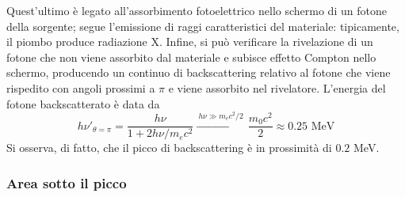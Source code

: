 \documentclass[11pt, a4paper]{scrartcl}
\theoremstyle{style}
\numberwithin{equation}{subsection}
\begin{document}
Quest'ultimo \`e legato all'assorbimento fotoelettrico nello schermo di un fotone della sorgente; segue l'emissione di raggi caratteristici del materiale: tipicamente, il piombo produce radiazione X.
Infine, si pu\`o verificare la rivelazione di un fotone che non viene assorbito dal materiale e subisce effetto Compton nello schermo, producendo un continuo di backscattering relativo al fotone che viene rispedito con angoli prossimi a $\pi$ e viene assorbito nel rivelatore.
L'energia del fotone backscatterato \`e data da 
\[
	h \nu ' _{\theta = \pi} = \frac{h\nu }{1 + 2 h\nu  / m_ec^2} \xrightarrow{\ h\nu \gg m_e c^2 / 2 \ } \frac{m_0 c^2}{2} \approx 0.25 \text{ MeV}
\] 
Si osserva, di fatto, che il picco di backscattering \`e in prossimit\`a di $0.2$ MeV.

\subsubsection{Area sotto il picco}
\end{document}
